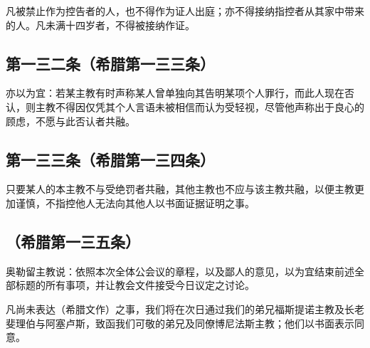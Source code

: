 \par

凡被禁止作为控告者的人，也不得作为证人出庭；亦不得接纳指控者从其家中带来的人。凡未满十四岁者，不得被接纳作证。\par


\subsection{第一三二条（希腊第一三三条）}

\par

亦以为宜：若某主教有时声称某人曾单独向其告明某项个人罪行，而此人现在否认，则主教不得因仅凭其个人言语未被相信而认为受轻视，尽管他声称出于良心的顾虑，不愿与此否认者共融。\par


\subsection{第一三三条（希腊第一三四条）}

\par

只要某人的本主教不与受绝罚者共融，其他主教也不应与该主教共融，以便主教更加谨慎，不指控他人无法向其他人以书面证据证明之事。\par


\subsection{（希腊第一三五条）}

奥勒留主教说：依照本次全体公会议的章程，以及鄙人的意见，以为宜结束前述全部标题的所有事项，并让教会文件接受今日议定之讨论。\par

凡尚未表达（希腊文作）之事，我们将在次日通过我们的弟兄福斯提诺主教及长老斐理伯与阿塞卢斯，致函我们可敬的弟兄及同僚博尼法斯主教；他们以书面表示同意。\par


